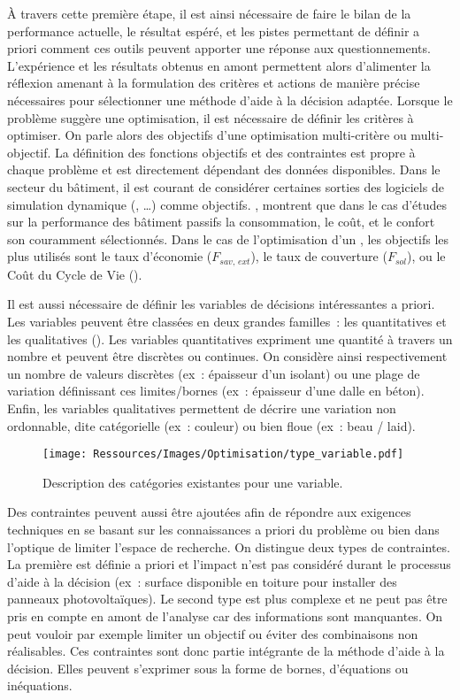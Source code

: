 À travers cette première étape, il est ainsi nécessaire de faire le bilan de la
performance actuelle, le résultat espéré, et les pistes permettant de définir a priori
comment ces outils peuvent apporter une réponse aux questionnements. L’expérience et les
résultats obtenus en amont permettent alors d’alimenter la réflexion amenant à la
formulation des critères et actions de manière précise nécessaires pour sélectionner une
méthode d’aide à la décision adaptée. Lorsque le problème suggère une optimisation, il est
nécessaire de définir les critères à optimiser. On parle alors des objectifs d’une
optimisation multi-critère ou multi-objectif. La définition des fonctions objectifs et des
contraintes est propre à chaque problème et est directement dépendant des données
disponibles. Dans le secteur du bâtiment, il est courant de considérer certaines sorties
des logiciels de simulation dynamique (, \dots) comme objectifs.
\textcite{Attia2013110}, montrent que dans le cas d’études sur la performance des bâtiment
passifs la consommation, le coût, et le confort son couramment sélectionnés. Dans le cas
de l’optimisation d’un , les objectifs les plus utilisés sont le taux d’économie ($F_{sav,\, ext}$),
le taux de couverture ($F_{sol}$), ou le Coût du Cycle de Vie ().

Il est aussi nécessaire de définir les variables de décisions intéressantes a priori.
Les variables peuvent être classées en deux grandes familles~: les quantitatives et
les qualitatives ().
Les variables quantitatives expriment une quantité à travers un nombre et
peuvent être discrètes ou continues. On considère ainsi respectivement un nombre de
valeurs discrètes (ex~: épaisseur d’un isolant) ou une plage de variation définissant
ces limites/bornes (ex~: épaisseur d’une dalle en béton).
Enfin, les variables qualitatives permettent de décrire une variation non ordonnable,
dite catégorielle (ex~: couleur) ou bien floue (ex~: beau / laid).

\begin{figure}
    \centering
    \texttt{[image: Ressources/Images/Optimisation/type\_variable.pdf]}
    \caption{Description des catégories existantes pour une variable.}
    \label{fig:type_variable}
\end{figure}

Des contraintes peuvent aussi être ajoutées afin de répondre aux exigences
techniques en se basant sur les connaissances a priori du problème ou bien dans
l’optique de limiter l’espace de recherche. On distingue deux types de contraintes.
La première est définie a priori et l’impact n’est pas considéré durant le processus
d’aide à la décision (ex~: surface disponible en toiture pour installer des
panneaux photovoltaïques).
Le second type est plus complexe et ne peut pas être pris en compte en amont de
l’analyse car des informations sont manquantes. On peut vouloir par exemple limiter
un objectif ou éviter des combinaisons non réalisables. Ces contraintes sont donc
partie intégrante de la méthode d’aide à la décision.
Elles peuvent s’exprimer sous la forme de bornes, d’équations ou inéquations.


